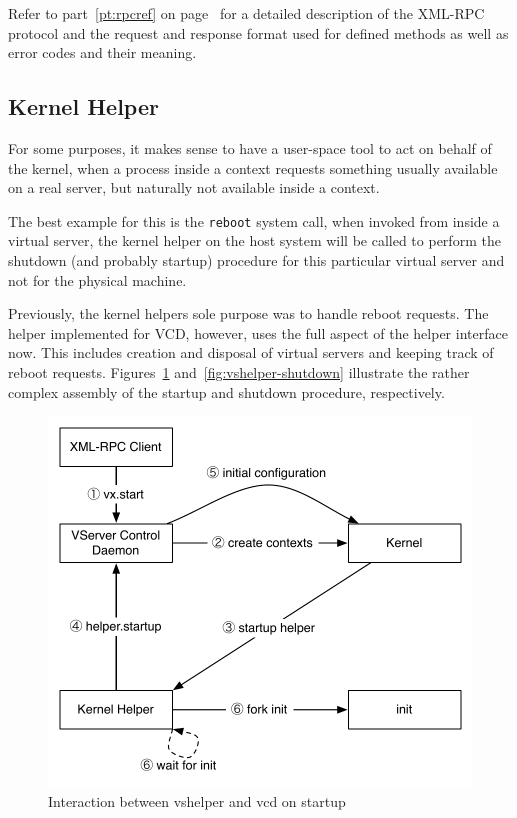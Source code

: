 Refer to part~\ref{pt:rpcref} on page~\pageref{pt:rpcref} for a detailed
description of the XML-RPC protocol and the request and response format used
for defined methods as well as error codes and their meaning.


\subsection{Kernel Helper}

For some purposes, it makes sense to have a user-space tool to act on behalf
of the kernel, when a process inside a context requests something usually
available on a real server, but naturally not available inside a context.

The best example for this is the \verb,reboot, system call, when invoked from
inside a virtual server, the kernel helper on the host system will be called
to perform the shutdown (and probably startup) procedure for this particular
virtual server and not for the physical machine.

Previously, the kernel helpers sole purpose was to handle reboot requests. The
helper implemented for VCD, however, uses the full aspect of the helper
interface now. This includes creation and disposal of virtual servers and
keeping track of reboot requests. Figures~\ref{fig:vshelper-startup}
and~\ref{fig:vshelper-shutdown} illustrate the rather complex assembly of the
startup and shutdown procedure, respectively.

\begin{figure}[hbt]
	\center
	\includegraphics[scale=0.6]{intro/vshelper-startup}
	\caption{Interaction between vshelper and vcd on startup}
	\label{fig:vshelper-startup}
\end{figure}

